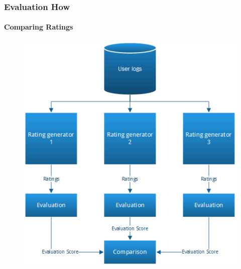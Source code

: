 \documentclass{beamer}
\begin{document}
  \begin{frame}
    \frametitle{Evaluation How}
    \framesubtitle{Comparing Ratings}
    \begin{figure}[H]
        \includegraphics[scale=0.4]{../src/image/ratinggeneval.png}
        \centering
    \end{figure}
  \end{frame}
\end{document}
